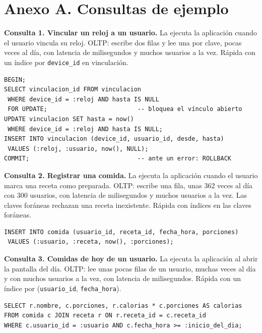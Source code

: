 \documentclass[11pt]{article}
\begin{document}
\clearpage
\section{Anexo A. Consultas de ejemplo}

\par\noindent\begin{minipage}{\linewidth}\setlength{\parskip}{1ex}
\textbf{Consulta 1. Vincular un reloj a un usuario.} La ejecuta la aplicación
cuando el usuario vincula su reloj. OLTP: escribe dos filas y lee una por
clave, pocas veces al día, con latencia de milisegundos y muchos usuarios a la
vez. Rápida con un índice por \texttt{device\_id} en vinculación.
\begin{lstlisting}
BEGIN;
SELECT vinculacion_id FROM vinculacion
 WHERE device_id = :reloj AND hasta IS NULL
 FOR UPDATE;                         -- bloquea el vínculo abierto
UPDATE vinculacion SET hasta = now()
 WHERE device_id = :reloj AND hasta IS NULL;
INSERT INTO vinculacion (device_id, usuario_id, desde, hasta)
 VALUES (:reloj, :usuario, now(), NULL);
COMMIT;                              -- ante un error: ROLLBACK
\end{lstlisting}\end{minipage}\par\medskip

\par\noindent\begin{minipage}{\linewidth}\setlength{\parskip}{1ex}
\textbf{Consulta 2. Registrar una comida.} La ejecuta la aplicación cuando el
usuario marca una receta como preparada. OLTP: escribe una fila, unas 362 veces al día con 300 usuarios, con latencia de milisegundos y muchos usuarios a la vez. Las claves foráneas
rechazan una receta inexistente. Rápida con índices en las claves foráneas.
\begin{lstlisting}
INSERT INTO comida (usuario_id, receta_id, fecha_hora, porciones)
 VALUES (:usuario, :receta, now(), :porciones);
\end{lstlisting}\end{minipage}\par\medskip

\par\noindent\begin{minipage}{\linewidth}\setlength{\parskip}{1ex}
\textbf{Consulta 3. Comidas de hoy de un usuario.} La ejecuta la aplicación al
abrir la pantalla del día. OLTP: lee unas pocas filas de un usuario, muchas
veces al día y con muchos usuarios a la vez, con latencia de milisegundos.
Rápida con un índice por (\texttt{usuario\_id}, \texttt{fecha\_hora}).
\begin{lstlisting}
SELECT r.nombre, c.porciones, r.calorias * c.porciones AS calorias
FROM comida c JOIN receta r ON r.receta_id = c.receta_id
WHERE c.usuario_id = :usuario AND c.fecha_hora >= :inicio_del_dia;
\end{lstlisting}\end{minipage}\par\medskip
\end{document}
